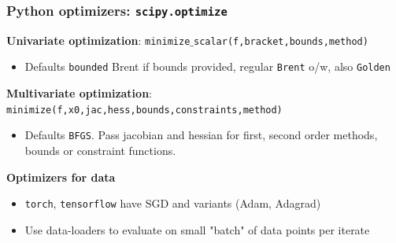 \documentclass[bigger]{beamer}
\begin{document}
\begin{frame}%

\frametitle{Python optimizers: \texttt{scipy.optimize} }

\textbf{Univariate optimization}:\newline
\qquad \texttt{minimize}$\_$\texttt{scalar(f,bracket,bounds,method)}
\begin{itemize}
\item Defaults \texttt{bounded} Brent if bounds provided, regular \texttt{Brent} o/w, also \texttt{Golden}
\end{itemize}

\textbf{Multivariate optimization}:\newline
\qquad \texttt{minimize(f,x0,jac,hess,bounds,constraints,method)}
\begin{itemize}
\item Defaults \texttt{BFGS}. Pass jacobian and hessian for first, second order methods, bounds or constraint functions.

\end{itemize}

\textbf{Optimizers for data}
\begin{itemize}
\item \texttt{torch}, \texttt{tensorflow} have SGD and variants (Adam, Adagrad)
\item Use data-loaders to evaluate on small "batch" of data points per iterate
\end{itemize}

\end{frame}%
\end{document}
